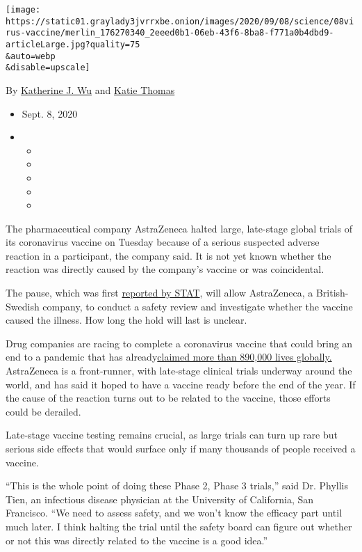 \texttt{[image: https://static01.graylady3jvrrxbe.onion/images/2020/09/08/science/08virus-vaccine/merlin\_176270340\_2eeed0b1-06eb-43f6-8ba8-f771a0b4dbd9-articleLarge.jpg?quality=75\\\&auto=webp\\\&disable=upscale]}

By
\href{https://www.nytimes3xbfgragh.onion/by/katherine-j--wu}{Katherine
J. Wu} and
\href{https://www.nytimes3xbfgragh.onion/by/katie-thomas}{Katie Thomas}

\begin{itemize}
\item
  Sept. 8, 2020
\item
  \begin{itemize}
  \item
  \item
  \item
  \item
  \item
  \end{itemize}
\end{itemize}

The pharmaceutical company AstraZeneca halted large, late-stage global
trials of its coronavirus vaccine on Tuesday because of a serious
suspected adverse reaction in a participant, the company said. It is not
yet known whether the reaction was directly caused by the company's
vaccine or was coincidental.

The pause, which was first
\href{https://www.statnews.com/2020/09/08/astrazeneca-covid-19-vaccine-study-put-on-hold-due-to-suspected-adverse-reaction-in-participant-in-the-u-k/}{reported
by STAT}, will allow AstraZeneca, a British-Swedish company, to conduct
a safety review and investigate whether the vaccine caused the illness.
How long the hold will last is unclear.

Drug companies are racing to complete a coronavirus vaccine that could
bring an end to a pandemic that has
already\href{https://www.nytimes3xbfgragh.onion/interactive/2020/world/coronavirus-maps.html}{claimed
more than 890,000 lives globally.} AstraZeneca is a front-runner, with
late-stage clinical trials underway around the world, and has said it
hoped to have a vaccine ready before the end of the year. If the cause
of the reaction turns out to be related to the vaccine, those efforts
could be derailed.

Late-stage vaccine testing remains crucial, as large trials can turn up
rare but serious side effects that would surface only if many thousands
of people received a vaccine.

``This is the whole point of doing these Phase 2, Phase 3 trials,'' said
Dr. Phyllis Tien, an infectious disease physician at the University of
California, San Francisco. ``We need to assess safety, and we won't know
the efficacy part until much later. I think halting the trial until the
safety board can figure out whether or not this was directly related to
the vaccine is a good idea.''

